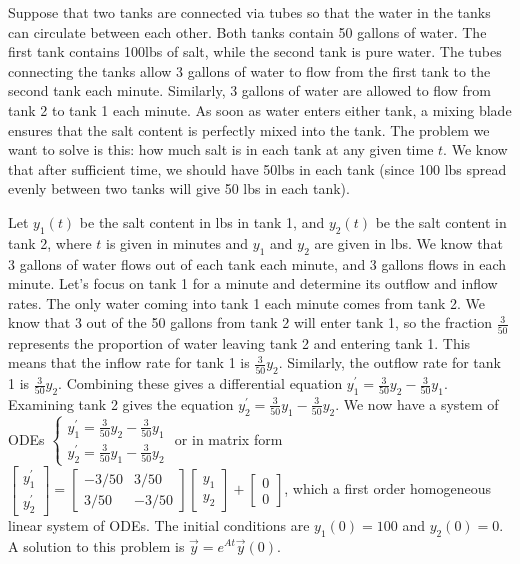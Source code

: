\documentclass[10pt]{article}
\theoremstyle{plain}
\theoremstyle{box}
\begin{document}
Suppose that two tanks are connected via tubes so that the water in the tanks can circulate between each other.  Both tanks contain 50 gallons of water. The first tank contains 100lbs of salt, while the second tank is pure water.  The tubes connecting the tanks allow 3 gallons of water to flow from the first tank to the second tank each minute.  Similarly, 3 gallons of water are allowed to flow from tank 2 to tank 1 each minute. As soon as water enters either tank, a mixing blade ensures that the salt content is perfectly mixed into the tank.  The problem we want to solve is this: how much salt is in each tank at any given time $t$.  We know that after sufficient time, we should have 50lbs in each tank (since 100 lbs spread evenly between two tanks will give 50 lbs in each tank).

Let $y_1(t)$ be the salt content in lbs in tank 1, and $y_2(t)$ be the salt content in tank 2, where $t$ is given in minutes and $y_1$ and $y_2$ are given in lbs. We know that 3 gallons of water flows out of each tank each minute, and 3 gallons flows in each minute.  Let's focus on tank 1 for a minute and determine its outflow and inflow rates.  The only water coming into tank 1 each minute comes from tank 2.  We know that 3 out of the 50 gallons from tank 2 will enter tank 1, so the fraction $\frac{3}{50}$ represents the proportion of water leaving tank 2 and entering tank 1. This means that the inflow rate for tank 1 is $\frac{3}{50}y_2$.  Similarly, the outflow rate for tank 1 is $\frac{3}{50}y_2$.  Combining these gives a differential equation $y_1^\prime = \frac{3}{50}y_2 - \frac{3}{50}y_1$.  Examining tank 2 gives the equation $y_2^\prime = \frac{3}{50}y_1 - \frac{3}{50}y_2$.  We now have a system of ODEs 
$\begin{cases}
y_1^\prime = \frac{3}{50}y_2 - \frac{3}{50}y_1\\
y_2^\prime = \frac{3}{50}y_1 - \frac{3}{50}y_2
\end{cases}$ or in matrix form 
$
\begin{bmatrix}
y_1^\prime\\
y_2^\prime
\end{bmatrix}
=
\begin{bmatrix}
-3/50&3/50\\
3/50&-3/50
\end{bmatrix}
\begin{bmatrix}
y_1\\
y_2
\end{bmatrix}
+
\begin{bmatrix}
0\\
0
\end{bmatrix}$, which a first order homogeneous linear system of ODEs. The initial conditions are $y_1(0)=100$ and $y_2(0)=0$. A solution to this problem is $\vec y = e^{A t}\vec y(0)$.
\end{document}
